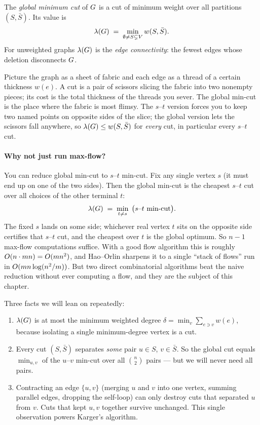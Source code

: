 \begin{definition}\label{ch11:def-mincut}
The \emph{global minimum cut} of $G$ is a cut of minimum weight over all partitions $(S,\bar S)$. Its value is
\[
  \lambda(G) \;=\; \min_{\emptyset\neq S\subsetneq V} w(S,\bar S).
\]
For unweighted graphs $\lambda(G)$ is the \emph{edge connectivity}: the fewest edges whose deletion disconnects $G$.
\end{definition}

\begin{intuitionbox}
Picture the graph as a sheet of fabric and each edge as a thread of a certain thickness $w(e)$. A cut is a pair of scissors slicing the fabric into two nonempty pieces; its cost is the total thickness of the threads you sever. The global min-cut is the place where the fabric is most flimsy. The $s$--$t$ version forces you to keep two named points on opposite sides of the slice; the global version lets the scissors fall anywhere, so $\lambda(G) \le w(S,\bar S)$ for \emph{every} cut, in particular every $s$--$t$ cut.
\end{intuitionbox}

\paragraph{Why not just run max-flow?}
You can reduce global min-cut to $s$--$t$ min-cut. Fix any single vertex $s$ (it must end up on one of the two sides). Then the global min-cut is the cheapest $s$--$t$ cut over all choices of the other terminal $t$:
\[
  \lambda(G) \;=\; \min_{t\neq s}\; \big(\text{$s$--$t$ min-cut}\big).
\]
The fixed $s$ lands on some side; whichever real vertex $t$ sits on the opposite side certifies that $s$--$t$ cut, and the cheapest over $t$ is the global optimum. So $n-1$ max-flow computations suffice. With a good flow algorithm this is roughly $O(n\cdot mn) = O(mn^2)$, and Hao--Orlin sharpens it to a single ``stack of flows'' run in $O(mn\log(n^2/m))$. But two direct combinatorial algorithms beat the naive reduction without ever computing a flow, and they are the subject of this chapter.

\begin{focusbox}
Three facts we will lean on repeatedly:
\begin{enumerate}
  \item $\lambda(G)$ is at most the minimum weighted degree $\delta = \min_v \sum_{e\ni v} w(e)$, because isolating a single minimum-degree vertex is a cut.
  \item Every cut $(S,\bar S)$ separates \emph{some} pair $u\in S$, $v\in \bar S$. So the global cut equals $\min_{u,v}$ of the $u$--$v$ min-cut over all $\binom{n}{2}$ pairs --- but we will never need all pairs.
  \item Contracting an edge $\{u,v\}$ (merging $u$ and $v$ into one vertex, summing parallel edges, dropping the self-loop) can only destroy cuts that separated $u$ from $v$. Cuts that kept $u,v$ together survive unchanged. This single observation powers Karger's algorithm.
\end{enumerate}
\end{focusbox}

